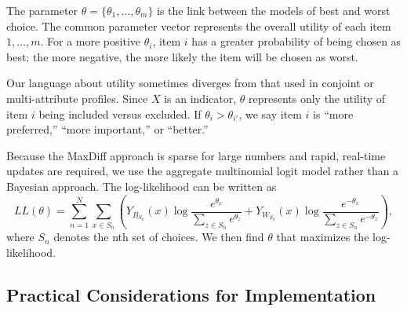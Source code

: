 \documentclass[nonblindrev]{informs3}
\newcommand{\numperset}{L}
\begin{document}
The parameter $\theta=\{\theta_1,\ldots,\theta_m \}$ is the link between the models of best and worst choice. The common parameter vector represents the overall utility of each item $1,\ldots,m$. For a more positive $\theta_i$, item $i$ has a greater probability of being chosen as best; the more negative, the more likely the item will be chosen as worst.

Our language about utility sometimes diverges from that used in conjoint or multi-attribute profiles. Since $X$ is an indicator, $\theta$ represents only the utility of item $i$ being included versus excluded. If $\theta_i > \theta_{i'}$, we say item $i$ is ``more preferred,'' ``more important,'' or ``better.''

Because the MaxDiff approach is sparse for large numbers and rapid, real-time updates are required, we use the aggregate multinomial logit model rather than a Bayesian approach. The log-likelihood can be written as
\[
LL(\theta)=\sum_{n=1}^N \sum_{x \in S_n} (Y_{B_{S_n}}(x)\log{\frac{e^{\theta_x}}{\sum_{z\in S_n} e^{\theta_z}}}+ Y_{W_{S_n}}(x)\log{\frac{e^{-\theta_x}}{\sum_{z\in S_n} e^{-\theta_z}}}),
\]
where $S_n$ denotes the nth set of choices. We then find $\theta$ that maximizes the log-likelihood. 

\subsection*{Practical Considerations for Implementation}


\end{document}
